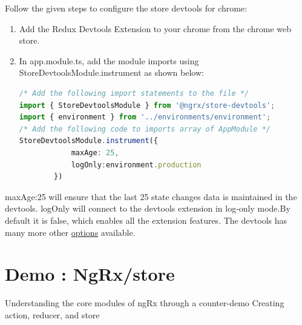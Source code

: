 \documentclass{report}
\begin{document}
Follow the given steps to configure the store devtools for chrome:
\begin{enumerate}
	\item{Add the Redux Devtools Extension to your chrome from the chrome web store.}
	\item{In app.module.ts, add the module imports using StoreDevtoolsModule.instrument as shown below:}
	\begin{lstlisting}[language=Typescript, caption=app.module.ts]
	/* Add the following import statements to the file */
import { StoreDevtoolsModule } from '@ngrx/store-devtools';
import { environment } from '../environments/environment';
/* Add the following code to imports array of AppModule */
StoreDevtoolsModule.instrument({
			maxAge: 25,
			logOnly:environment.production
		})

	\end{lstlisting}
\end{enumerate}
maxAge:25 will ensure that the last 25 state changes data is maintained in the devtools.
logOnly will connect to the devtools extension in log-only mode.By default it is false, which enables all the extension features.
The devtools has many more other \href{https://ngrx.io/guide/store-devtools/config}{options} available.
\section{Demo : NgRx/store}
Understanding the core modules of ngRx through a counter-demo
Creating action, reducer, and store
\end{document}
